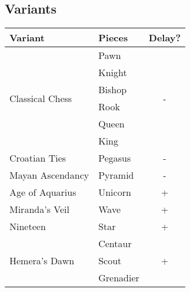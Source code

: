 \clearpage %

\subsection*{Variants}
\label{sec:Appendix/Introduction/Variants}

\begin{table}[!h]
\centering
\begin{tabular}{ llc }
\toprule %
\textbf{Variant}                 & \textbf{Pieces}   & \textbf{Delay?}      \\
\midrule %
\multirow{6}{*}{Classical Chess} & Pawn              & \multirow{6}{*}{-}   \\
                                 & Knight            &                      \\
                                 & Bishop            &                      \\
                                 & Rook              &                      \\
                                 & Queen             &                      \\
                                 & King              &                      \\
\cmidrule{1-3} %
Croatian Ties                    & Pegasus           & -                    \\
Mayan Ascendancy                 & Pyramid           & -                    \\
Age of Aquarius                  & Unicorn           & +                    \\
Miranda's Veil                   & Wave              & +                    \\
Nineteen                         & Star              & +                    \\
\cmidrule{1-3} %
\multirow{3}{*}{Hemera's Dawn}   & Centaur           & \multirow{3}{*}{+}   \\
                                 & Scout             &                      \\
                                 & Grenadier         &                      \\

\end{tabular}
\end{table}
